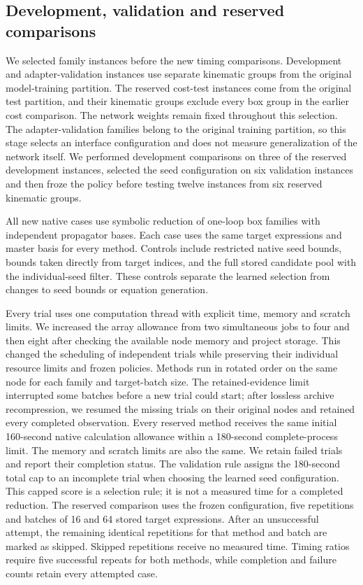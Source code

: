 

\subsection{Development, validation and reserved comparisons}
We selected family instances before the new timing comparisons.
Development and adapter-validation instances use separate kinematic
groups from the original model-training partition. The reserved
cost-test instances come from the original test partition, and their
kinematic groups exclude every box group in the earlier cost comparison.
The network weights remain fixed throughout this selection.
The adapter-validation families belong to the original training
partition, so this stage selects an interface configuration and does
not measure generalization of the network itself. We performed
development comparisons on three of the reserved development
instances, selected the seed configuration on six validation instances
and then froze the policy before testing twelve instances from six
reserved kinematic groups.

All new native cases use symbolic reduction of one-loop box families
with independent propagator bases. Each case uses the same target expressions and master
basis for every method. Controls include restricted native seed bounds,
bounds taken directly from target indices, and the full stored candidate
pool with the individual-seed filter. These controls separate the
learned selection from changes to seed bounds or equation generation.

Every trial uses one computation thread with explicit time, memory and
scratch limits. We increased the array allowance from two simultaneous
jobs to four and then eight after checking the available node memory and project
storage. This changed the scheduling of independent trials while
preserving their individual resource limits and frozen policies. Methods run in rotated order on the same node for each
family and target-batch size. The retained-evidence limit interrupted some batches before a new trial could start; after lossless archive recompression, we resumed the missing trials on their original nodes and retained every completed observation. Every reserved method receives the same
initial 160-second native calculation allowance within a 180-second
complete-process limit. The memory and scratch limits are also the
same. We retain failed trials and report their completion status.
The validation rule assigns the 180-second total cap to an incomplete
trial when choosing the learned seed configuration. This capped score
is a selection rule; it is not a measured time for a completed
reduction. The reserved comparison uses the frozen configuration,
five repetitions and batches of 16 and 64 stored target expressions.
After an unsuccessful attempt, the remaining identical repetitions for
that method and batch are marked as skipped. Skipped repetitions receive
no measured time. Timing ratios require five successful repeats for both
methods, while completion and failure counts retain every attempted
case.







